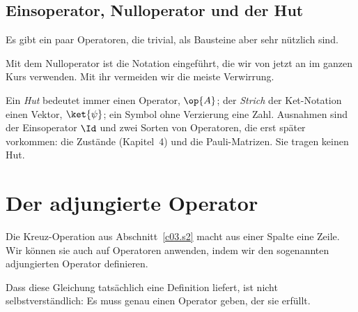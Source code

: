 \subsection{Einsoperator, Nulloperator und der Hut}\label{c03.s8.1}

Es gibt ein paar Operatoren, die trivial, als Bausteine aber sehr nützlich sind.


Mit dem Nulloperator ist die Notation eingeführt, die wir von jetzt an im ganzen Kurs verwenden.
Mit ihr vermeiden wir die meiste Verwirrung.

\begin{merksatz}[Notation]
  Ein \emph{Hut} bedeutet immer einen Operator, $\op{A}$; der \emph{Strich} der Ket-Notation
  einen Vektor, $\ket{\psi}$; ein Symbol ohne Verzierung eine Zahl. Ausnahmen sind der
  Einsoperator $\Id$ und zwei Sorten von Operatoren, die erst später vorkommen: die Zustände
  (Kapitel~4) und die Pauli-Matrizen. Sie tragen keinen Hut.
\end{merksatz}

\section{Der adjungierte Operator}\label{c03.s9}

Die Kreuz-Operation aus Abschnitt~\ref{c03.s2} macht aus einer Spalte eine Zeile. Wir können sie
auch auf Operatoren anwenden, indem wir den sogenannten adjungierten Operator definieren.


Dass diese Gleichung tatsächlich eine Definition liefert, ist nicht selbstverständlich: Es muss
genau einen Operator geben, der sie erfüllt.

